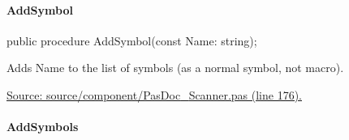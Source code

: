 \documentclass{report}
\newif\ifpdf
\begin{document}
\paragraph*{AddSymbol}\hspace*{\fill}

\label{PasDoc_Scanner.TScanner-AddSymbol}
\begin{list}{}{
\setlength{\itemindent}{0cm}
\setlength{\listparindent}{0cm}
\setlength{\leftmargin}{\evensidemargin}
\addtolength{\leftmargin}{\tmplength}
\settowidth{\labelsep}{X}
\addtolength{\leftmargin}{\labelsep}
\setlength{\labelwidth}{\tmplength}
}
\item[\textbf{Declaration}\hfill]
\ifpdf
\begin{flushleft}
\fi
\begin{ttfamily}
public procedure AddSymbol(const Name: string);\end{ttfamily}

\ifpdf
\end{flushleft}
\fi

\par
\item[\textbf{Description}]
Adds Name to the list of symbols (as a normal symbol, not macro).\par
\href{https://github.com/pasdoc/pasdoc/blob/master/source/component/PasDoc_Scanner.pas#L176}{Source: source/component/PasDoc{\_}Scanner.pas (line 176).}

\end{list}
\paragraph*{AddSymbols}\hspace*{\fill}
\end{document}
